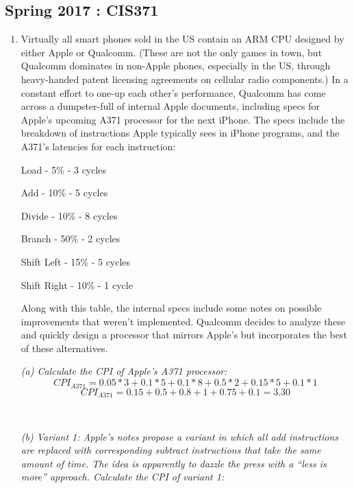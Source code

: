 \documentclass[12pt]{article}
\newenvironment{QandA}{\begin{enumerate}[label=\bfseries\arabic*.]\bfseries}
                      {\end{enumerate}}
\newenvironment{answered}{\par\quad\normalfont}{}
\begin{document}
\subsection{Spring 2017 : CIS371}

\begin{QandA}
   \item Virtually all smart phones sold in the US contain an ARM CPU designed by either Apple or Qualcomm.
    (These are not the only games in town, but Qualcomm dominates in non-Apple phones, especially
    in the US, through heavy-handed patent licensing agreements on cellular radio components.) In a
    constant effort to one-up each other’s performance, Qualcomm has come across a dumpster-full of
    internal Apple documents, including specs for Apple’s upcoming A371 processor for the next iPhone.
    The specs include the breakdown of instructions Apple typically sees in iPhone programs, and the
    A371’s latencies for each instruction:

    Load - 5\% - 3 cycles

    Add - 10\% - 5 cycles

    Divide - 10\% - 8 cycles

    Branch - 50\% - 2 cycles

    Shift Left - 15\% - 5 cycles

    Shift Right - 10\% - 1 cycle
    
    Along with this table, the internal specs include some notes on possible improvements that weren’t
    implemented. Qualcomm decides to analyze these and quickly design a processor that mirrors Apple’s
    but incorporates the best of these alternatives.

    \begin{answered}
    
    \textit{(a) Calculate the CPI of Apple’s A371 processor:}
    \begin{equation*}
        CPI_{A371} = 0.05 * 3 + 0.1 * 5 + 0.1 * 8 + 0.5 * 2 + 0.15 * 5 + 0.1 * 1
    \end{equation*}
    \begin{equation*}
        CPI_{A371} = 0.15 + 0.5 + 0.8 + 1 + 0.75 + 0.1 = 3.30
    \end{equation*}
    
    \ 
    
    \textit{(b) Variant 1: Apple’s notes propose a variant in which all add instructions are replaced with corresponding subtract instructions that take the same amount of time. The idea is apparently to dazzle the press with a “less is more” approach. Calculate the CPI of variant 1:}
    

\end{answered}
\end{QandA}
\end{document}
